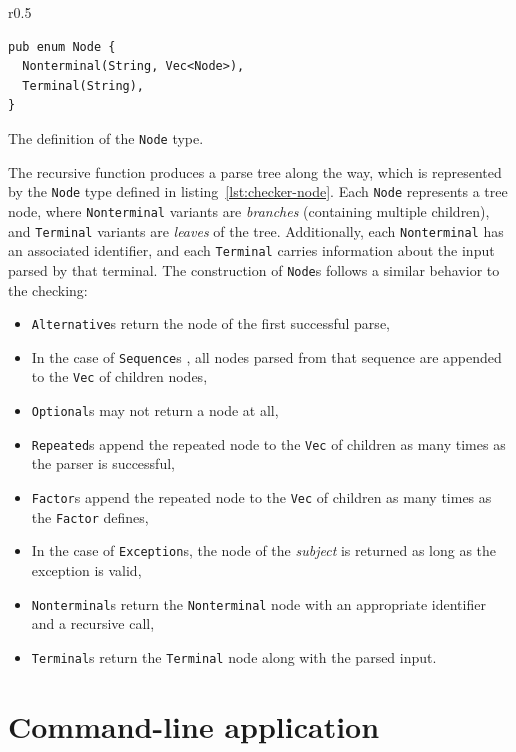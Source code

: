 \documentclass[english,engineering]{wizthesis}
\begin{document}
\begin{wraplisting}{r}{0.5\textwidth}
  \begin{verbatim}
pub enum Node {
  Nonterminal(String, Vec<Node>),
  Terminal(String),
}
  \end{verbatim}
  \caption{The definition of the \texttt{Node} type.}
  \label{lst:checker-node}
\end{wraplisting}

The recursive function produces a parse tree along the way, which is represented
by the \texttt{Node} type defined in listing~\ref{lst:checker-node}. Each
\texttt{Node} represents a tree node, where \texttt{Nonterminal} variants are
\emph{branches} (containing multiple children), and \texttt{Terminal} variants
are \emph{leaves} of the tree. Additionally, each \texttt{Nonterminal} has an
associated identifier, and each \texttt{Terminal} carries information about the
input parsed by that terminal. The construction of \texttt{Node}s follows a
similar behavior to the checking:
\begin{itemize}
  \item \texttt{Alternative}s return the node of the first successful parse,
  \item In the case of \texttt{Sequence}s , all nodes parsed from that sequence
  are appended to the \texttt{Vec} of children nodes,
  \item \texttt{Optional}s may not return a node at all,
  \item \texttt{Repeated}s append the repeated node to the \texttt{Vec} of
  children as many times as the parser is successful,
  \item \texttt{Factor}s append the repeated node to the \texttt{Vec} of
  children as many times as the \texttt{Factor} defines,
  \item In the case of \texttt{Exception}s, the node of the \emph{subject} is
  returned as long as the exception is valid,
  \item \texttt{Nonterminal}s return the \texttt{Nonterminal} node with an
  appropriate identifier and a recursive call,
  \item \texttt{Terminal}s return the \texttt{Terminal} node along with the
  parsed input.
\end{itemize}

\newpage

\section{Command-line application} \label{sec:command-line-application}
\end{document}
